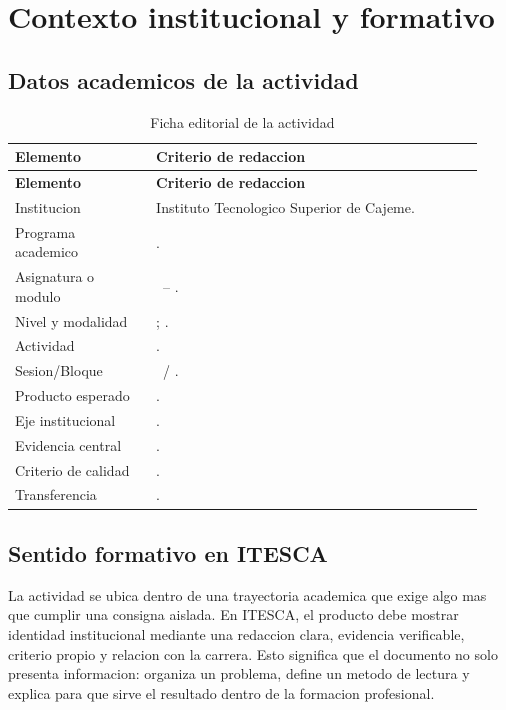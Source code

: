 \documentclass[
	spanish,
	letterpaper, oneside
]{article}
\def\universityname {Instituto Tecnologico Superior de Cajeme}
\begin{document}

\section{Contexto institucional y formativo}

\subsection{Datos academicos de la actividad}

\begin{longtable}{@{}p{0.28\linewidth}p{0.65\linewidth}@{}}
	\caption{Ficha editorial de la actividad}\label{tab:ficha-editorial-itesca}\\
	\toprule
	\textbf{Elemento} & \textbf{Criterio de redaccion} \\
	\midrule
	\endfirsthead
	\toprule
	\textbf{Elemento} & \textbf{Criterio de redaccion} \\
	\midrule
	\endhead
	Institucion & \universityname. \\
	Programa academico & \itescafaculty. \\
	Asignatura o modulo & \itescacoursecode\ -- \itescacoursename. \\
	Nivel y modalidad & \itescaprogramlevel; \itescamodality. \\
	Actividad & \itescaactivityname. \\
	Sesion/Bloque & \itescasessionname\ / \itescablockname. \\
	Producto esperado & \itescamainproduct. \\
	Eje institucional & \itescainstitutionalaxis. \\
	Evidencia central & \itescaevidencefocus. \\
	Criterio de calidad & \itescaqualitycriterion. \\
	Transferencia & \itescatransfercontext. \\
	\bottomrule
\end{longtable}

\subsection{Sentido formativo en ITESCA}

La actividad se ubica dentro de una trayectoria academica que exige algo mas
que cumplir una consigna aislada. En ITESCA, el producto debe mostrar identidad
institucional mediante una redaccion clara, evidencia verificable, criterio
propio y relacion con la carrera. Esto significa que el documento no solo
presenta informacion: organiza un problema, define un metodo de lectura y
explica para que sirve el resultado dentro de la formacion profesional.
\end{document}
